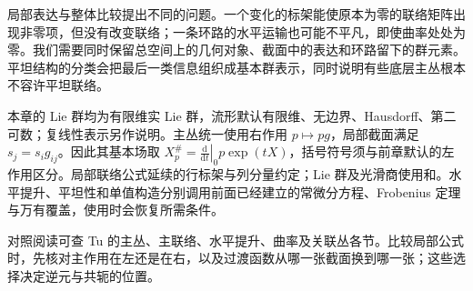 \ProseParagraphBreak

局部表达与整体比较提出不同的问题。一个变化的标架能使原本为零的联络矩阵出现非零项，但没有改变联络；一条环路的水平运输也可能不平凡，即使曲率处处为零。我们需要同时保留总空间上的几何对象、截面中的表达和环路留下的群元素。平坦结构的分类会把最后一类信息组织成基本群表示，同时说明有些底层主丛根本不容许平坦联络。

\ProseParagraphBreak

本章的 Lie 群均为有限维实 Lie 群，流形默认有限维、无边界、Hausdorff、第二可数；复线性表示另作说明。主丛统一使用右作用 \(p\mapsto pg\)，局部截面满足 \(s_j=s_i g_{ij}\)。因此其基本场取 \(X_p^\#=\left.\frac{\mathrm{d}}{\mathrm{d}t}\right|_0p\exp(tX)\)，括号符号须与前章默认的左作用区分。局部联络公式延续的行标架与列分量约定；Lie 群及光滑商使用和。水平提升、平坦性和单值构造分别调用前面已经建立的常微分方程、Frobenius 定理与万有覆盖，使用时会恢复所需条件。

\ProseParagraphBreak

对照阅读可查 Tu 的主丛、主联络、水平提升、曲率及关联丛各节\cite[第27--31节]{Tu2017Connections}。比较局部公式时，先核对主作用在左还是在右，以及过渡函数从哪一张截面换到哪一张；这些选择决定逆元与共轭的位置。






